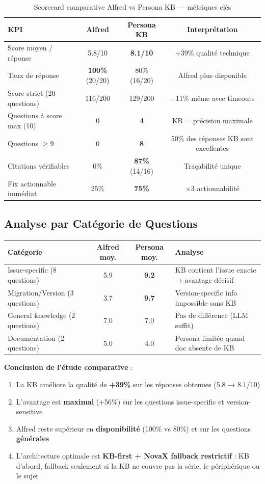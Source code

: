 \documentclass[12pt,a4paper]{report}
\begin{document}
\begin{table}[H]
\centering
\begin{tabular}{lccc}
\toprule
\textbf{KPI} & \textbf{Alfred} & \textbf{Persona KB} & \textbf{Interprétation} \\
\midrule
Score moyen / réponse & 5.8/10 & \textbf{8.1/10} & +39\% qualité technique \\
Taux de réponse & \textbf{100\%} (20/20) & 80\% (16/20) & Alfred plus disponible \\
Score strict (20 questions) & 116/200 & 129/200 & +11\% même avec timeouts \\
Questions à score max (10) & 0 & \textbf{4} & KB = précision maximale \\
Questions $\geq 9$ & 0 & \textbf{8} & 50\% des réponses KB sont excellentes \\
Citations vérifiables & 0\% & \textbf{87\%} (14/16) & Traçabilité unique \\
Fix actionnable immédiat & 25\% & \textbf{75\%} & $\times 3$ actionnabilité \\
\bottomrule
\end{tabular}
\caption{Scorecard comparative Alfred vs Persona KB --- métriques clés}
\label{tab:scorecard_comparative}
\end{table}

\subsection{Analyse par Catégorie de Questions}

\begin{longtable}{p{4cm}ccp{5.5cm}}
\toprule
\textbf{Catégorie} & \textbf{Alfred moy.} & \textbf{Persona moy.} & \textbf{Analyse} \\
\midrule
Issue-specific (8 questions) & 5.9 & \textbf{9.2} & KB contient l'issue exacte → avantage décisif \\
Migration/Version (3 questions) & 3.7 & \textbf{9.7} & Version-specific info impossible sans KB \\
General knowledge (2 questions) & 7.0 & 7.0 & Pas de différence (LLM suffit) \\
Documentation (2 questions) & 5.0 & 4.0 & Persona limitée quand doc absente de KB \\
\bottomrule
\end{longtable}

\textbf{Conclusion de l'étude comparative} :
\begin{enumerate}
  \item La KB améliore la qualité de \textbf{+39\%} sur les réponses obtenues (5.8 → 8.1/10)
  \item L'avantage est \textbf{maximal} (+56\%) sur les questions issue-specific et version-sensitive
  \item Alfred reste supérieur en \textbf{disponibilité} (100\% vs 80\%) et sur les questions \textbf{générales}
  \item L'architecture optimale est \textbf{KB-first + NovaX fallback restrictif} : KB d'abord, fallback seulement si la KB ne couvre pas la série, le périphérique ou le sujet
\end{enumerate}
\end{document}
